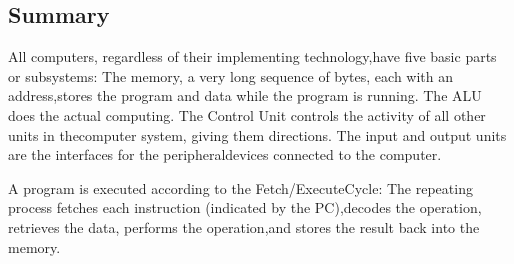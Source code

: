 \subsection{Summary}
All computers, regardless of their implementing technology,have five basic parts or subsystems:
The memory, a very long sequence of bytes, each with an address,stores the program and data while the program is running.
The ALU does the actual computing.
The Control Unit controls the activity of all other units in thecomputer system, giving them directions.
The input and output units are the interfaces for the peripheraldevices connected to the computer.

A program is executed according to the Fetch/ExecuteCycle:
The repeating process fetches each instruction (indicated by the PC),decodes the operation, retrieves the data, performs the operation,and stores the result back into the memory.
